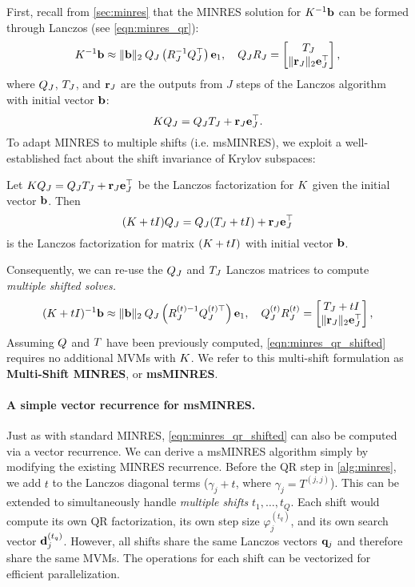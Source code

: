 First, recall from \cref{sec:minres} that the MINRES solution for $K^{-1} \mathbf{b}$ can be formed through Lanczos (see \cref{eqn:minres_qr}):
\begin{equation}
  K^{-1} \mathbf{b} \approx \Vert \mathbf{b} \Vert_2 \: Q_J \left( R^{-1}_J Q_J^\top \right) \mathbf{e}_1,
  \quad
  Q_J R_J = \begin{bmatrix} T_J \\ \Vert \mathbf{r}_J \Vert_2 \mathbf{e}_J^\top \end{bmatrix},
  \label{eqn:minres_qr2}
\end{equation}
where $Q_J$, $T_J$, and $\mathbf{r}_J$ are the outputs from $J$ steps of the Lanczos algorithm with initial vector $\mathbf{b}$:
\[
  K Q_J = Q_J T_J + \mathbf{r}_J \mathbf{e}_J^\top.
\]
To adapt MINRES to multiple shifts (i.e. msMINRES), we exploit a well-established fact about the shift invariance of Krylov subspaces:
%
\begin{observation}
  Let $K Q_J = Q_J T_J + \mathbf{r}_J \mathbf{e}_J^\top$ be the Lanczos factorization for $K$ given the initial vector $\mathbf{b}$.
  Then $$(K + t I) Q_J = Q_J (T_J + t I) + \mathbf{r}_J \mathbf{e}_J^\top$$ is the Lanczos factorization for matrix $(K + t I)$ with initial vector $\mathbf{b}$.
\end{observation}
%
\noindent
Consequently, we can re-use the $Q_J$ and $T_J$ Lanczos matrices to compute \emph{multiple shifted solves.}
%
\begin{equation}
  (K + t I)^{-1} \mathbf{b} \approx \Vert \mathbf{b} \Vert_2 \: Q_J \left( R^{(t){-1}}_J Q_J^{(t)\top} \right) \mathbf{e}_1,
  \quad
  Q_J^{(t)} R_J^{(t)} = \begin{bmatrix} T_J + t I \\ \Vert \mathbf{r}_J \Vert_2 \mathbf{e}_J^\top \end{bmatrix},
  \label{eqn:minres_qr_shifted}
\end{equation}
%
Assuming $Q$ and $T$ have been previously computed, \cref{eqn:minres_qr_shifted} requires no additional MVMs with $K$.
We refer to this multi-shift formulation as {\bf Multi-Shift MINRES}, or {\bf msMINRES}.



\paragraph{A simple vector recurrence for msMINRES.}
Just as with standard MINRES, \cref{eqn:minres_qr_shifted} can also be computed via a vector recurrence.
We can derive a msMINRES algorithm simply by modifying the existing MINRES recurrence.
Before the QR step in \cref{alg:minres}, we add $t$ to the Lanczos diagonal terms ($\gamma_j + t$, where $\gamma_j = T^{(j,j)}$).
This can be extended to simultaneously handle \emph{multiple shifts} $t_1, \ldots, t_Q$.
Each shift would compute its own QR factorization, its own step size $\varphi_j^{(t_q)}$, and its own search vector $\mathbf{d}_j^{(t_q)}$.
However, all shifts share the same Lanczos vectors $\mathbf{q}_j$ and therefore share the same MVMs.
The operations for each shift can be vectorized for efficient parallelization.

